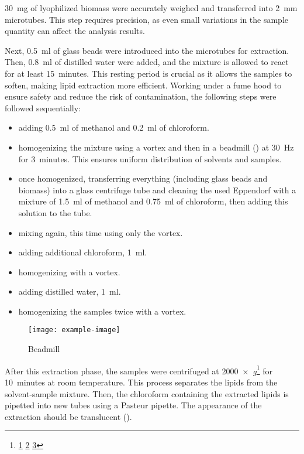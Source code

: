 \zariv{} \qty{30}{\milli\gram} of lyophilized biomass were accurately weighed and transferred into \qty{2}{\milli\metre} microtubes. This step requires precision, as even small variations in the sample quantity can affect the analysis results.

Next, \qty{0.5}{\milli\litre} of glass beads were introduced into the microtubes for extraction. Then, \qty{0.8}{\milli\litre} of distilled water were added, and the mixture is allowed to react for at least \qty{15}{minutes}. This resting period is crucial as it allows the samples to soften, making lipid extraction more efficient. Working under a fume hood to ensure safety and reduce the risk of contamination, the following steps were followed sequentially:
\begin{itemize}
\item adding \qty{0,5}{\milli\litre} of methanol and \qty{0,2}{\milli\litre} of chloroform.
\item homogenizing the mixture using a vortex and then in a beadmill () at \qty{30}{\hertz} for \qty{3}{minutes}. This ensures uniform distribution of solvents and samples.
\item once homogenized, transferring everything (including glass beads and biomass) into a glass centrifuge tube and cleaning the used Eppendorf with a mixture of \qty{1,5}{\milli\litre} of methanol and \qty{0,75}{\milli\litre} of chloroform, then adding this solution to the tube.
\item mixing again, this time using only the vortex.
\item adding additional chloroform, \qty{1}{\milli\litre}.
\item homogenizing with a vortex.
\item adding distilled water, \qty{1}{\milli\litre}.
\item homogenizing the samples twice with a vortex.
\end{itemize}

\begin{figure}[H]
	\centering
	\texttt{[image: example-image]}
	\caption[]{Beadmill}
	\label{fig:}
\end{figure}

After this extraction phase, the samples were centrifuged at 2000~×~\textsl{g}\footnote{\zariv{} \href{https://www.fishersci.it/it/it/scientific-products/centrifuge-guide/centrifuge-applications-tools/rpm-rcf-calculator.html}{1} \href{https://www.sigmaaldrich.com/IT/it/support/calculators-and-apps/g-force-calculator}{2} \href{https://tomy.amuzainc.com/blog/optimizing-centrifuge-speed/}{3}} for \qty{10}{minutes} at room temperature. This process separates the lipids from the solvent-sample mixture. Then, the chloroform containing the extracted lipids is pipetted into new tubes using a Pasteur pipette. The appearance of the extraction should be translucent ().

